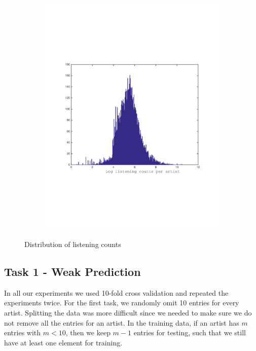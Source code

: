 \begin{figure}[h]
\begin{subfigure}[b]{0.45\textwidth}
    \caption{}
  \end{subfigure}
  \begin{subfigure}[b]{0.45\textwidth}
    \includegraphics[width=\textwidth]{figures/histCountPerArtist.pdf}
    \caption{}
  \end{subfigure}
  \caption{Distribution of listening counts}
  \label{fig:user_artist_distribution}
\end{figure}

 
\subsection{Task 1 - Weak Prediction}
In all our experiments we used 10-fold cross validation and repeated the experiments twice. For the first task, we randomly omit 10 entries for every artist. Splitting the data was more difficult since we needed to make sure we do not remove all the entries for an artist. In the training data, if an artist has $m$ entries with $m < 10$, then we keep $m-1$ entries for testing, such that we still have at least one element for training.
 
